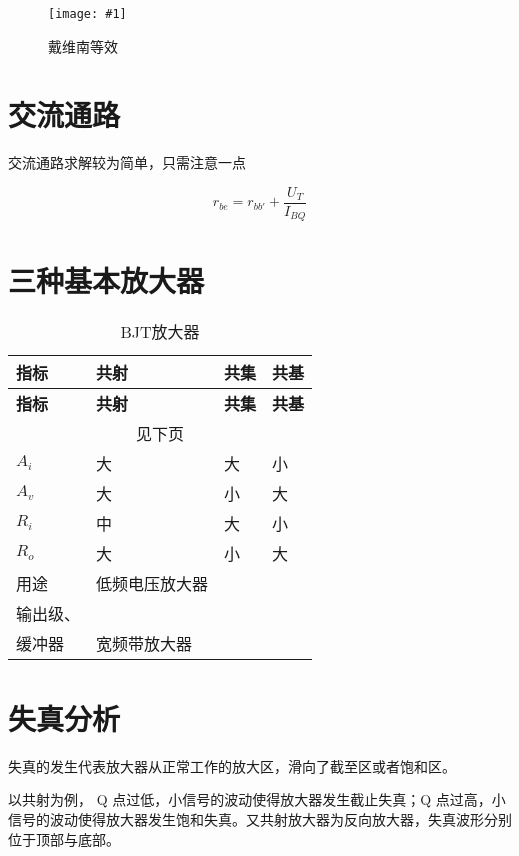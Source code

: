 \documentclass[cn,11pt,chinese,black,simple]{../elegantbook}
\newcommand{\qfig}[2]{\begin{figure}[!htb]
    \centering
    \texttt{[image: \#1]}
    \caption{#2}
  \end{figure}}
\begin{document}
\qfig{f2.png}{戴维南等效}

\section{交流通路}

交流通路求解较为简单，只需注意一点

\[r_{be} = r_{bb'} + \frac{U_T}{I_{BQ}}\]


\section{三种基本放大器}


\begin{longtable}{llll}
    \caption{BJT放大器} \\
    \toprule \textbf{指标} & \textbf{共射} & \textbf{共集} & \textbf{共基} \\
    \midrule
    \endfirsthead
    
    \toprule \textbf{指标} & \textbf{共射} & \textbf{共集} & \textbf{共基} \\
    \midrule
    \endhead

    \hline
    \multicolumn{4}{c}{见下页}\\   
    \bottomrule
    \endfoot

    \bottomrule
    \endlastfoot

    $A_i$       & 大           & 大                                                         & 小           \\
    $A_v$       & 大           & 小                                                         & 大           \\
    $R_i$       & 中           & 大                                                         & 小           \\
    $R_o$       & 大           & 小                                                         & 大           \\
    \hline 用途          & 低频电压放大器     & \begin{tabular}[c]{@{}l@{}}输入级、\\ 输出级、\\ 缓冲器\end{tabular} & 宽频带放大器     

    
\end{longtable}

\section{失真分析}

失真的发生代表放大器从正常工作的放大区，滑向了截至区或者饱和区。

以共射为例，
Q 点过低，小信号的波动使得放大器发生截止失真；Q 点过高，小信号的波动使得放大器发生饱和失真。又共射放大器为反向放大器，失真波形分别位于顶部与底部。





\ifx\mainclass\undefined
\end{document}

